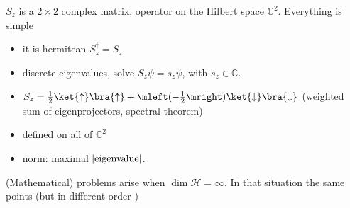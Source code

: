 \documentclass[12pt]{article}
\numberwithin{equation}{section}
\theoremstyle{plain}
\theoremstyle{plain}
\begin{document}
$S_z$ is a $2\times 2$ complex matrix, operator on the Hilbert space $\mathbb{C}^2$. Everything is simple
\begin{itemize}
	\item it is hermitean $S_z^\dagger = S_z$
	\item discrete eigenvalues, solve $S_z \psi = s_z \psi$, with $s_z \in \mathbb{C}$.
	\item $S_z = \frac{1}{2} \ket{\uparrow}\bra{\uparrow} +
          \mleft(- \frac{1}{2} \mright) \ket{\downarrow}
          \bra{\downarrow}$ (weighted sum of eigenprojectors, spectral
          theorem)
	\item defined on all of $\mathbb{C}^2$
	\item norm: maximal $|\hbox{eigenvalue}|$.
\end{itemize}

(Mathematical) problems arise when $\dim \mathcal H = \infty$. In that situation the same points (but in different order )
\end{document}
